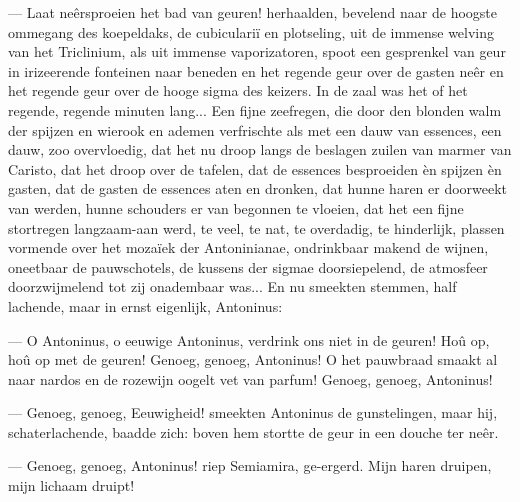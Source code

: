 \documentclass[a4paper, 12pt, oneside, dutch]{article}
\begin{document}
--- Laat neêrsproeien het bad van geuren! herhaalden, bevelend naar de hoogste ommegang des koepeldaks, de cubiculariï en plotseling, uit de immense welving van het Triclinium, als uit immense vaporizatoren, spoot een gesprenkel van geur in irizeerende fonteinen naar beneden en het regende geur over de gasten neêr en het regende geur over de hooge sigma des keizers. In de zaal was het of het regende, regende minuten lang... Een fijne zeefregen, die door den blonden walm der spijzen en wierook en ademen verfrischte als met een dauw van essences, een dauw, zoo overvloedig, dat het nu droop langs de beslagen zuilen van marmer van Caristo, dat het droop over de tafelen, dat de essences besproeiden èn spijzen èn gasten, dat de gasten de essences aten en dronken, dat hunne haren er doorweekt van werden, hunne schouders er van begonnen te vloeien, dat het een fijne stortregen langzaam-aan werd, te veel, te nat, te overdadig, te hinderlijk, plassen vormende over het mozaïek der Antoninianae, ondrinkbaar makend de wijnen, oneetbaar de pauwschotels, de kussens der sigmae doorsiepelend, de atmosfeer doorzwijmelend tot zij onadembaar was... En nu smeekten stemmen, half lachende, maar in ernst eigenlijk, Antoninus:

--- O Antoninus, o eeuwige Antoninus, verdrink ons niet in de geuren! Hoû op, hoû op met de geuren! Genoeg, genoeg, Antoninus! O het pauwbraad smaakt al naar nardos en de rozewijn oogelt vet van parfum! Genoeg, genoeg, Antoninus!

--- Genoeg, genoeg, Eeuwigheid! smeekten Antoninus de gunstelingen, maar hij, schaterlachende, baadde zich: boven hem stortte de geur in een douche ter neêr.

--- Genoeg, genoeg, Antoninus! riep Semiamira, ge-ergerd. Mijn haren druipen, mijn lichaam druipt!
\end{document}
